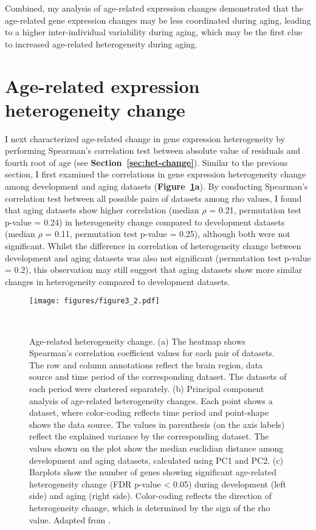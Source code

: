 Combined, my analysis of age-related expression changes demonstrated that the age-related gene expression changes may be less coordinated during aging,
leading to a higher inter-individual variability during aging, which may be the first clue to increased age-related heterogeneity during aging.

\section{Age-related expression heterogeneity change}
I next characterized age-related change in gene expression heterogeneity by performing Spearman's correlation test between absolute value of residuals and fourth root of age (see \textbf{Section~\ref{sec:het-change}}).
Similar to the previous section, I first examined the correlations in gene expression heterogeneity change among development and aging datasets (\textbf{Figure~\ref{fig:fig3.2}a}).
By conducting  Spearman's correlation test between all possible pairs of datasets among rho values, 
I found that aging datasets show higher correlation (median $\rho$ = 0.21, permutation test p-value = 0.24) in heterogeneity change
compared to development datasets (median $\rho$ = 0.11, permutation test p-value = 0.25), although both were not significant.
Whilst the difference in correlation of heterogeneity change between development and aging datasets was also not significant (permutation test p-value = 0.2),
this observation may still suggest that aging datasets show more similar changes in heterogeneity compared to development datasets.

\begin{figure}[!ht]
    \centering
    \texttt{[image: figures/figure3\_2.pdf]}
    \caption{Age-related heterogeneity change. 
    (a) The heatmap shows Spearman's correlation coefficient values for each pair of datasets.
    The row and column annotations reflect the brain region, data source and time period of the corresponding dataset.
    The datasets of each period were clustered separately.
    (b) Principal component analysis of age-related heterogeneity changes. Each point shows a dataset, 
    where color-coding reflects time period and point-shape shows the data source. 
    The values in parenthesis (on the axis labels) reflect the explained variance by the corresponding dataset.
    The values shown on the plot show the median euclidian distance among development and aging datasets, 
    calculated using PC1 and PC2.
    (c) Barplots show the number of genes showing significant age-related heterogeneity change (FDR p-value < 0.05) during development (left side) and aging (right side).
    Color-coding reflects the direction of heterogeneity change, which is determined by the sign of the rho value.
    Adapted from \autocite{Isildak2020}.
    }~\label{fig:fig3.2}
\end{figure}

